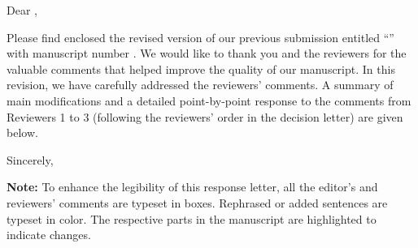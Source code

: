 Dear \theeditor,

Please find enclosed the revised version of our previous submission entitled \enquote{\thetitle} with manuscript number \themanuscript.
We would like to thank you and the reviewers for the valuable comments that helped improve the quality of our manuscript.
In this revision, we have carefully addressed the reviewers' comments.
A summary of main modifications and a detailed point-by-point response to the comments from Reviewers 1 to 3 (following the reviewers' order in the decision letter) are given below.

\vspace{1.2em}

Sincerely,

\vspace{1.7em}

\theauthor

\vfil
\textbf{Note:} To enhance the legibility of this response letter, all the editor's and reviewers' comments are typeset in boxes. Rephrased or added sentences are typeset in color. The respective parts in the manuscript are highlighted to indicate changes.
